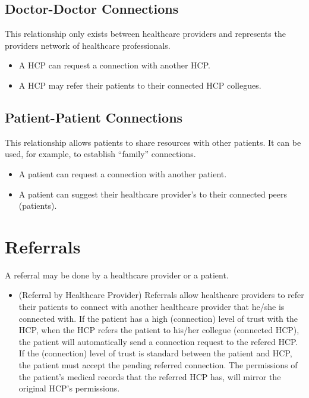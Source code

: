 \subsection{Doctor-Doctor Connections}
This relationship only exists between healthcare providers and represents the providers network of healthcare professionals.
\begin{itemize}
\item A HCP can request a connection with another HCP. 
\item A HCP may refer their patients to their connected HCP collegues. 
\end{itemize} 

\subsection{Patient-Patient Connections}
This relationship allows patients to share resources with other patients. It can be used, for example, to establish ``family'' connections.
\begin{itemize}
\item A patient can request a connection with another patient. 
\item A patient can suggest their healthcare provider's to their connected peers (patients).
\end{itemize} 

\section{Referrals}
A referral may be done by a healthcare provider or a patient.

\begin{itemize}
\item (Referral by Healthcare Provider) Referrals allow healthcare providers to refer their patients to connect with another healthcare provider that he/she is connected with. If the patient has a high (connection) level of trust with the HCP, when the HCP refers the patient to his/her collegue (connected HCP), the patient will automatically send a connection request to the refered HCP. If the (connection) level of trust is standard between the patient and HCP, the patient must accept the pending referred connection. The permissions of the patient's medical records that the referred HCP has, will mirror the original HCP's permissions.
\end{itemize}


